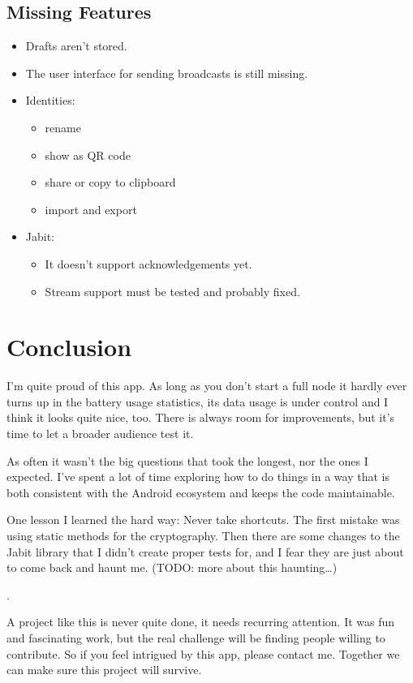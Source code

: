 \documentclass{bfh}
\begin{document}
  \subsection{Missing Features}
  \begin{itemize}
    \item Drafts aren't stored.
    \item The user interface for sending broadcasts is still missing.
    \item Identities:
      \begin{itemize}
        \item rename
        \item show as QR code
        \item share or copy to clipboard
        \item import and export
      \end{itemize}
    \item Jabit:
      \begin{itemize}
        \item It doesn't support acknowledgements yet.
        \item Stream support must be tested and probably fixed.
      \end{itemize}
  \end{itemize}



  \newpage
  \section{Conclusion}

  I'm quite proud of this app. As long as you don’t start a full node it hardly ever turns up in the battery usage statistics, its data usage is under control and I think it looks quite nice, too. There is always room for improvements, but it's time to let a broader audience test it.

  As often it wasn't the big questions that took the longest, nor the ones I expected. I've spent a lot of time exploring how to do things in a way that is both consistent with the Android ecosystem and keeps the code maintainable.

  One lesson I learned the hard way: Never take shortcuts. The first mistake was using static methods for the cryptography. Then there are some changes to the Jabit library that I didn’t create proper tests for, and I fear they are just about to come back and haunt me.
(TODO: more about this haunting…)

.

  A project like this is never quite done, it needs recurring attention. It was fun and fascinating work, but the real challenge will be finding people willing to contribute. So if you feel intrigued by this app, please contact me. Together we can make sure this project will survive.


  \newpage
  
  
\end{document}
